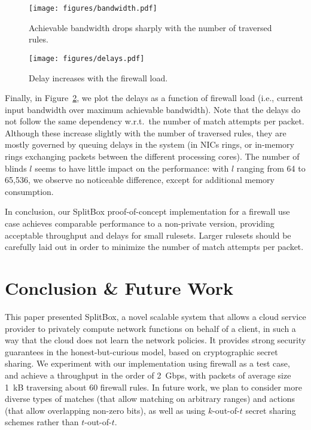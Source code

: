 \RequirePackage{fix-cm} \let\oldvec\vec \documentclass{sig-alternate-05-2015}
\newif\ifshort
\begin{document}
\begin{figure}[t]
 \centering
 \texttt{[image: figures/bandwidth.pdf]}
 \ifshort\else\vspace{-0.3cm}\fi
 \caption{Achievable bandwidth drops sharply with the number of traversed
 rules.}
 \ifshort\else\vspace{-0.3cm}\fi
 \label{fig:bandwidth}
\end{figure}

\begin{figure}[t]
 \centering
 \texttt{[image: figures/delays.pdf]}
 \ifshort\else\vspace{-0.3cm}\fi
 \caption{Delay increases with the firewall load.}
 \ifshort\else\vspace{-0.3cm}\fi
 \label{fig:delays}
\end{figure}

Finally, in Figure~\ref{fig:delays}, we plot the delays as a function of firewall load
(i.e., current input bandwidth over maximum achievable bandwidth).
Note that the delays do not follow the same dependency w.r.t.~the
number of match attempts per packet. Although these increase slightly with
the number of traversed rules, they are mostly governed by queuing delays in
the system (in NICs rings, or in-memory rings exchanging packets between
the different processing cores). 
The number of blinds $l$ seems to have little impact on the performance: with
$l$ ranging from 64 to 65,536, we observe no noticeable difference,
except for additional memory consumption.

In conclusion, our SplitBox proof-of-concept implementation 
for a firewall use case achieves comparable performance 
to a non-private version, providing
acceptable throughput and delays for small rulesets. Larger rulesets should be
carefully laid out in order to minimize the number of match attempts per
packet.


\section{Conclusion \& Future Work}
This paper presented SplitBox, a novel scalable system that allows a cloud service provider to privately compute
network functions on behalf of a client, in such a way that the cloud does not learn the network 
policies. It provides strong security guarantees in the honest-but-curious model, based on cryptographic secret sharing.
We experiment with our implementation using firewall as a test case, and achieve a throughput 
in the order of 2~Gbps, with packets of average size 1~kB traversing about 60 firewall rules. 
In future work, we plan to consider more diverse types of 
matches (that allow matching on arbitrary ranges) and actions (that allow overlapping non-zero bits), 
as well as using $k$-out-of-$t$
secret sharing schemes rather than $t$-out-of-$t$.
\end{document}
